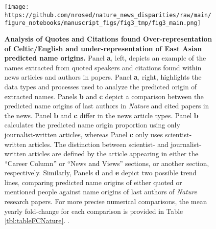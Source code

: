 \begin{figure}
\hypertarget{fig:fig3}{%
\centering
\texttt{[image: https://github.com/nrosed/nature\_news\_disparities/raw/main/figure\_notebooks/manuscript\_figs/fig3\_tmp/fig3\_main.png]}
\caption{\textbf{Analysis of Quotes and Citations found Over-representation of Celtic/English and under-representation of East Asian predicted name origins.}
Panel \textbf{a}, left, depicts an example of the names extracted from quoted speakers and citations found within news articles and authors in papers.
Panel \textbf{a}, right, highlights the data types and processes used to analyze the predicted origin of extracted names. Panels \textbf{b} and \textbf{c} depict a comparison between the predicted name origins of last authors in \emph{Nature} and cited papers in the news.
Panel \textbf{b} and \textbf{c} differ in the news article types.
Panel \textbf{b} calculates the predicted name origin proportion using only journalist-written articles, whereas Panel \textbf{c} only uses scientist-written articles.
The distinction between scientist- and journalist-written articles are defined by the article appearing in either the ``Career Column'' or ``News and Views'' sections, or another section, respectively.
Similarly, Panels \textbf{d} and \textbf{e} depict two possible trend lines, comparing predicted name origins of either quoted or mentioned people against name origins of last authors of \emph{Nature} research papers.
For more precise numerical comparisons, the mean yearly fold-change for each comparison is provided in Table \ref{tbl:tableFCNature}.
.}\label{fig:fig3}
}
\end{figure}

